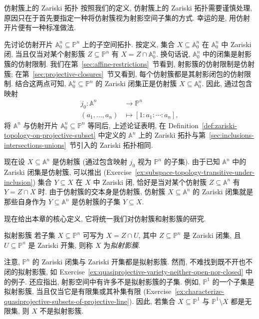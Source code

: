 \begin{Example}{仿射簇上的 Zariski 拓扑}\leavevmode\label{ex:zariski-topology-on-affine-varieties}
按照我们的定义, 仿射簇上的 Zariski 拓扑需要谨慎处理, 原因只在于首先要指定一种将仿射簇视为射影空间子集的方式. 幸运的是, 用仿射开片便有一种标准做法.

先讨论仿射开片 $\mathbb{A}^{n}_{0}\subseteq\mathbb{P}^{n}$ 上的子空间拓扑. 按定义, 集合 $X\subseteq\mathbb{A}^{n}_{0}$ 在 $\mathbb{A}^{n}_{0}$ 中 Zariski 闭, 当且仅当对某个射影簇 $Z\subseteq\mathbb{P}^{n}$ 有 $X=Z\cap\mathbb{A}^{n}_{0}$. 换句话说, $\mathbb{A}^{n}_{0}$ 中的闭集是射影簇的仿射限制. 我们在第~\ref{sec:affine-restrictions}~节看到, 射影簇的仿射限制是仿射簇; 在第~\ref{sec:projective-closures}~节又看到, 每个仿射簇都是其射影闭包的仿射限制. 结合这两点可知, $\mathbb{A}^{n}_{0}\subseteq\mathbb{P}^{n}$ 的 Zariski 闭集正是仿射簇 $X\subseteq\mathbb{A}^{n}_{0}$. 因此, 通过包含映射
\[
  \begin{aligned}
    j_{0}:\mathbb{A}^{n}&\to\mathbb{P}^{n}\\
    (a_{1},\ldots,a_{n})&\mapsto[1:a_{1}:\cdots:a_{n}],
  \end{aligned}
\]
将 $\mathbb{A}^{n}$ 与仿射开片 $\mathbb{A}^{n}_{0}\subseteq\mathbb{P}^{n}$ 等同后, 上述论证表明, 在 Definition~\ref{def:zariski-topology-on-projective-subset} 中定义的 $\mathbb{A}^{n}$ 上的 Zariski 拓扑与第~\ref{sec:inclusions-intersections-unions}~节引入的 Zariski 拓扑相同.

现在设 $X\subseteq\mathbb{A}^{n}$ 是仿射簇 (通过包含映射 $j_{0}$ 视为 $\mathbb{P}^{n}$ 的子集). 由于已知 $\mathbb{A}^{n}$ 中的 Zariski 闭集是仿射簇, 可以推出 (Exercise~\ref{ex:subspace-topology-transitive-under-inclusion}) 集合 $Y\subseteq X$ 在 $X$ 中 Zariski 闭, 恰好是当对某个仿射簇 $Z\subseteq\mathbb{A}^{n}$ 有 $Y=Z\cap X$ 时. 由于仿射簇的交本身是仿射簇, 仿射簇 $X\subseteq\mathbb{A}^{n}$ 的 Zariski 闭集就是那些自身作为 $Y\subseteq\mathbb{A}^{n}$ 是仿射簇的子集 $Y\subseteq X$.
\end{Example}

现在给出本章的核心定义, 它将统一我们对仿射簇和射影簇的研究.

\begin{Definition}{拟射影簇}\leavevmode\label{def:quasiprojective-variety}
若子集 $X\subseteq\mathbb{P}^{n}$ 可写为 $X=Z\cap U$, 其中 $Z\subseteq\mathbb{P}^{n}$ 是 Zariski 闭集, 且 $U\subseteq\mathbb{P}^{n}$ 是 Zariski 开集, 则称 $X$ 为\emph{拟射影簇}.
\end{Definition}

注意, $\mathbb{P}^{n}$ 的 Zariski 闭集与 Zariski 开集都是拟射影簇. 然而, 不难找到既不开也不闭的拟射影簇, 如 Exercise~\ref{ex:quasiprojective-variety-neither-open-nor-closed} 中的例子. 还应指出, 射影空间中有许多不是拟射影簇的子集. 例如, $\mathbb{P}^{1}$ 的一个子集是拟射影簇, 当且仅当它是有限集或其补集有限 (Exercise~\ref{ex:characterize-quasiprojective-subsets-of-projective-line}). 因此, 若集合 $X\subseteq\mathbb{P}^{1}$ 与 $\mathbb{P}^{1}\setminus X$ 都是无限集, 则 $X$ 不是拟射影簇.

